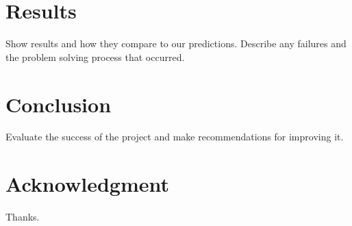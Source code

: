 \documentclass[journal]{IEEEtran}
\begin{document}
\section{Results}
Show results and how they compare to our predictions. Describe any failures and the problem solving process that occurred.

\section{Conclusion}
Evaluate the success of the project and make recommendations for improving it.

\section*{Acknowledgment}
Thanks.



\end{document}
